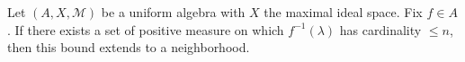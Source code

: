 
Let $(A, X, \mathcal{M})$ be a uniform algebra with $X$ the maximal ideal space. Fix $f \in A$. If there exists a set of positive measure on which $f^{-1}(\lambda)$ has cardinality $\leq n$, then this bound extends to a neighborhood.
